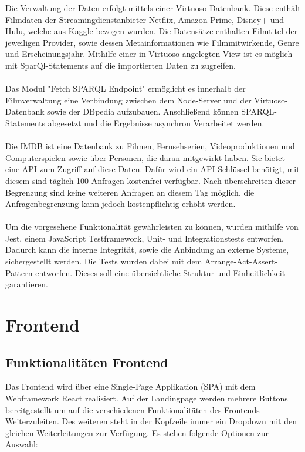\documentclass[conference]{IEEEtran}
\begin{document}
\smallskip

Die Verwaltung der Daten erfolgt mittels einer Virtuoso-Datenbank. Diese enthält Filmdaten der Streamingdienstanbieter
Netflix, Amazon-Prime, Disney+ und Hulu, welche aus Kaggle bezogen wurden.
Die Datensätze enthalten Filmtitel der jeweiligen Provider, sowie dessen Metainformationen wie 
Filmmitwirkende, Genre und Erscheinungsjahr. Mithilfe einer in Virtuoso angelegten View ist es möglich
mit SparQl-Statements auf die importierten Daten zu zugreifen.
\\
\\
Das Modul "Fetch SPARQL Endpoint" ermöglicht es innerhalb der Filmverwaltung eine Verbindung zwischen dem Node-Server
und der Virtuoso-Datenbank sowie der DBpedia aufzubauen. Anschließend können SPARQL-Statements abgesetzt und die Ergebnisse
asynchron Verarbeitet werden.
\\
\\
Die IMDB ist eine Datenbank zu Filmen, Fernsehserien, Videoproduktionen und Computerspielen sowie über Personen,
die daran mitgewirkt haben. Sie bietet eine API zum Zugriff auf diese Daten. Dafür wird ein API-Schlüssel benötigt, 
mit diesem sind täglich 100 Anfragen kostenfrei verfügbar. Nach überschreiten dieser Begrenzung sind keine weiteren Anfragen
an diesem Tag möglich, die Anfragenbegrenzung kann jedoch kostenpflichtig erhöht werden. 
\\
\\
Um die vorgesehene Funktionalität gewährleisten zu können, wurden mithilfe von Jest, einem JavaScript Testframework, 
Unit- und Integrationstests entworfen. Dadurch kann die interne Integrität, sowie die Anbindung an externe Systeme,
sichergestellt werden. Die Tests wurden dabei mit dem Arrange-Act-Assert-Pattern entworfen. Dieses soll eine 
übersichtliche Struktur und Einheitlichkeit garantieren.

\section{Frontend}

\subsection{Funktionalitäten Frontend}
Das Frontend wird über eine Single-Page Applikation (SPA) mit dem Webframework React realisiert.
Auf der Landingpage werden mehrere Buttons bereitgestellt um auf die verschiedenen Funktionalitäten des Frontends Weiterzuleiten.
Des weiteren steht in der Kopfzeile immer ein Dropdown mit den gleichen Weiterleitungen zur Verfügung.
Es stehen folgende Optionen zur Auswahl:
\end{document}
